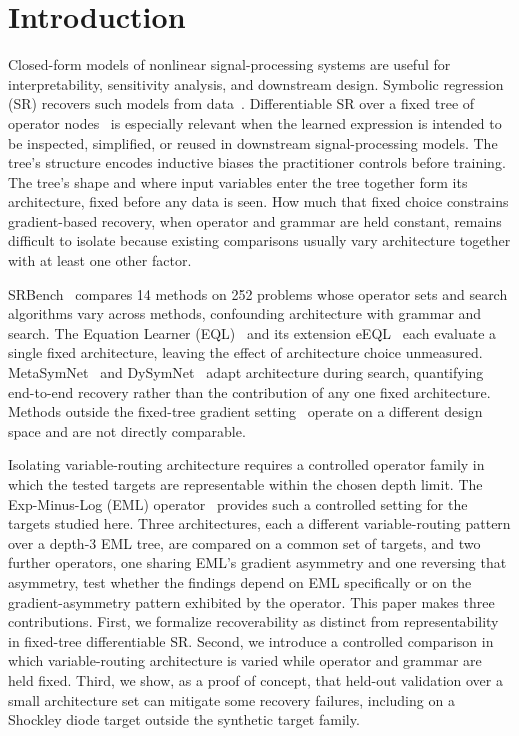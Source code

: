 \section{Introduction}
\label{sec:intro}

Closed-form models of nonlinear signal-processing systems are
useful for interpretability, sensitivity analysis, and downstream
design.  Symbolic regression (SR) recovers such models from
data~\citep{Cranmer2023pysr, LaCava2021srbench}.
Differentiable SR over a fixed tree of operator
nodes~\citep{Sahoo2018eql, Dong2024eeql, Odrzywolek2026eml} is
especially relevant when the learned expression is intended to
be inspected, simplified, or reused in downstream
signal-processing models.  The tree's structure encodes inductive
biases the practitioner controls before training.  The tree's
shape and where input variables enter the tree together form its
architecture, fixed before any data is seen.  How much that
fixed choice constrains gradient-based recovery, when operator
and grammar are held constant, remains difficult to isolate
because existing comparisons usually vary architecture together
with at least one other factor.

SRBench~\citep{LaCava2021srbench} compares 14 methods on 252
problems whose operator sets and search algorithms vary across
methods, confounding architecture with grammar and search.  The
Equation Learner (EQL)~\citep{Sahoo2018eql} and its extension
eEQL~\citep{Dong2024eeql} each evaluate a single fixed
architecture, leaving the effect of architecture choice
unmeasured.  MetaSymNet~\citep{Li2025metasymnet} and
DySymNet~\citep{Li2024dysymnet} adapt architecture during search,
quantifying end-to-end recovery rather than the contribution of
any one fixed architecture.  Methods outside the fixed-tree
gradient setting~\citep{Petersen2021dsr, Cranmer2023pysr,
Brunton2016sindy} operate on a different design space and are
not directly comparable.

Isolating variable-routing architecture requires a controlled
operator family in which the tested targets are representable
within the chosen depth limit.  The Exp-Minus-Log (EML) operator~\citep{Odrzywolek2026eml}
provides such a controlled setting for the targets studied here.  Three architectures, each a different
variable-routing pattern over a depth-3 EML tree, are compared
on a common set of targets, and two further operators, one
sharing EML's gradient asymmetry and one reversing that
asymmetry, test whether the findings depend on EML specifically
or on the gradient-asymmetry pattern exhibited by the operator.
This paper makes three contributions.  First, we formalize
recoverability as distinct from representability in fixed-tree
differentiable SR.  Second, we introduce a controlled comparison
in which variable-routing architecture is varied while operator
and grammar are held fixed.  Third, we show, as a proof of
concept, that held-out validation over a small architecture set
can mitigate some recovery failures, including on a Shockley
diode target outside the synthetic target family.
